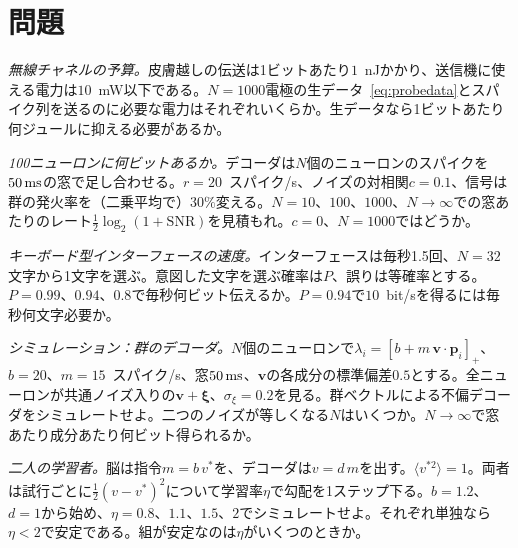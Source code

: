 \section{問題}

\begin{exercise}[\lvlA]
\label{ex:17:1}
\emph{無線チャネルの予算。}皮膚越しの伝送は1ビットあたり$1$~nJかかり、送信機に使える電力は$10$~mW以下である。$N=1000$電極の生データ~\eqref{eq:probedata}とスパイク列を送るのに必要な電力はそれぞれいくらか。生データなら1ビットあたり何ジュールに抑える必要があるか。
\end{exercise}

\begin{exercise}[\lvlA]
\label{ex:17:2}
\emph{100ニューロンに何ビットあるか。}デコーダは$N$個のニューロンのスパイクを$50\,\text{ms}$の窓で足し合わせる。$r=20$~スパイク/s、ノイズの対相関$c=0.1$、信号は群の発火率を（二乗平均で）$30\%$変える。$N=10$、$100$、$1000$、$N\to\infty$での窓あたりのレート$\tfrac12\log_2(1+\text{SNR})$を見積もれ。$c=0$、$N=1000$ではどうか。
\end{exercise}

\begin{exercise}[\lvlB]
\label{ex:17:3}
\emph{キーボード型インターフェースの速度。}インターフェースは毎秒1.5回、$N=32$文字から1文字を選ぶ。意図した文字を選ぶ確率は$P$、誤りは等確率とする。$P=0.99$、$0.94$、$0.8$で毎秒何ビット伝えるか。$P=0.94$で$10$~bit/sを得るには毎秒何文字必要か。
\end{exercise}

\begin{exercise}[\lvlB]
\label{ex:17:4}
\emph{シミュレーション：群のデコーダ。}$N$個のニューロンで$\lambda_i=[b+m\,\mathbf v\cdot\mathbf p_i]_+$、$b=20$、$m=15$~スパイク/s、窓$50\,\text{ms}$、$\mathbf v$の各成分の標準偏差$0.5$とする。全ニューロンが共通ノイズ入りの$\mathbf v+\boldsymbol\xi$、$\sigma_\xi=0.2$を見る。群ベクトルによる不偏デコーダをシミュレートせよ。二つのノイズが等しくなる$N$はいくつか。$N\to\infty$で窓あたり成分あたり何ビット得られるか。
\end{exercise}

\begin{exercise}[\lvlB]
\label{ex:17:5}
\emph{二人の学習者。}脳は指令$m=b\,v^*$を、デコーダは$v=d\,m$を出す。$\langle v^{*2}\rangle=1$。両者は試行ごとに$\tfrac12(v-v^*)^2$について学習率$\eta$で勾配を1ステップ下る。$b=1.2$、$d=1$から始め、$\eta=0.8$、$1.1$、$1.5$、$2$でシミュレートせよ。それぞれ単独なら$\eta<2$で安定である。組が安定なのは$\eta$がいくつのときか。
\end{exercise}

